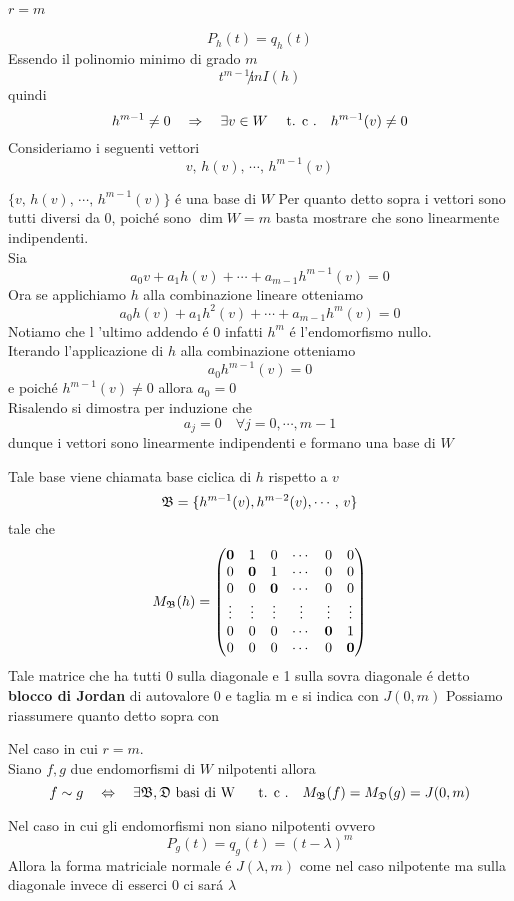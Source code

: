 \paragraph*{$r=m$}
$$P_h(t)=q_h(t) $$
Essendo il polinomio minimo di grado $m$  $$t^{m-1} \not in I(h) $$ 
quindi 
 $$h^{m-1} \neq 0  \quad \Rightarrow \quad \exists v \in W \quad \text{ t. c .} \quad h^{m-1} (v) \neq 0 $$
Consideriamo i seguenti vettori
 $$ v ,\, h(v) , \, \cdots , \, h^{m-1} (v) $$
 
\begin{lem}$\{ v ,\, h(v) , \, \cdots , \, h^{m-1} (v)  \} $ \'e una base di $W$ 
\proof Per quanto detto sopra i vettori sono tutti diversi da $0$, poich\'e sono $\dim W =m$ basta mostrare che sono linearmente indipendenti.\\
Sia 
$$ a_0 v+ a_1 h(v) +  \cdots + a_{m-1} h^{m-1} (v)=0$$
Ora se applichiamo $h$ alla combinazione lineare otteniamo 
$$ a_0 h(v)+ a_1 h^2(v) +  \cdots + a_{m-1} h^{m} (v)=0$$
Notiamo che l 'ultimo addendo \'e 0 infatti $h^m$ \'e l'endomorfismo nullo.\\
Iterando l'applicazione di $h$ alla combinazione  otteniamo 
$$a_0 h^{m-1} (v)=0 $$
e poich\'e $h^{m-1}(v) \neq 0 $ allora $a_0=0$ \\
Risalendo si dimostra per induzione che 
$$a_j =0 \quad \forall j=0, \cdots , m-1 $$ dunque i vettori sono linearmente indipendenti e formano una base di $W$ 
\endproof
\end{lem}
Tale base viene chiamata base ciclica di $h$ rispetto a $v$ 
 $$\B = \{ h^{m-1} (v) , h^{m-2}(v) , \cdots , \, v \} $$
tale che$$ M_\B(h) =
\begin{pmatrix}

\boldsymbol{0} & 1 & 0 & \cdots & 0 & 0 \\ 
0 & \boldsymbol{0} & 1 & \cdots & 0 & 0 \\ 
0 & 0 & \boldsymbol{0} & \cdots & 0 & 0 \\ 
\vdots & \vdots & \vdots & \vdots & \vdots & \vdots \\ 
0 & 0 & 0 & \cdots & \boldsymbol{0} & 1 \\ 
0 & 0 & 0 & \cdots & 0 & \boldsymbol{0}
\end{pmatrix} $$
Tale matrice che ha tutti $0$ sulla diagonale e 1 sulla sovra diagonale \'e detto \textbf{ blocco di Jordan } di autovalore 0 e taglia m e si indica con $J(0,m)$  \newpage
Possiamo riassumere quanto detto sopra con 
\begin{prop} Nel caso in cui $r=m$.\\
Siano $f,g$ due endomorfismi di $W$ nilpotenti allora
$$ f \sim g \quad \ses \quad \exists\B,\D \text{ basi di W } \tc M_\B(f) =M_\D(g)=J(0,m) $$
\end{prop}
\begin{oss} Nel caso in cui gli  endomorfismi non siano nilpotenti ovvero
$$ P_g(t)=q_g(t)=(t- \lambda)^m $$ 
Allora la forma matriciale normale \'e $J(\lambda,m) $ come nel caso nilpotente ma sulla diagonale invece di esserci $0$ ci sar\'a $\lambda $
\end{oss} \newpage

